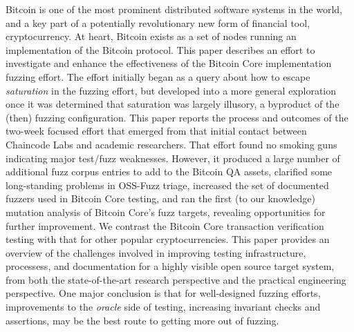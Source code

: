 Bitcoin is one of the most prominent distributed software systems in the world, and a key part of a potentially revolutionary new form of financial tool, cryptocurrency.  At heart, Bitcoin exists as a set of nodes running an implementation of the Bitcoin protocol.  This paper describes an effort to investigate and enhance the effectiveness of the Bitcoin Core implementation fuzzing effort.  The effort initially began as a query about how to escape \emph{saturation} in the fuzzing effort, but developed into a more general exploration once it was determined that saturation was largely illusory, a byproduct of the (then) fuzzing configuration.  This paper reports the process and outcomes of the two-week focused effort that emerged from that initial contact between Chaincode Labs and academic researchers.  That effort found no smoking guns indicating major test/fuzz weaknesses. However, it produced a large number of additional fuzz corpus entries to add to the Bitcoin QA assets, clarified some long-standing problems in OSS-Fuzz triage, increased the set of documented fuzzers used in Bitcoin Core testing, and ran the first (to our knowledge) mutation analysis of Bitcoin Core's fuzz targets, revealing opportunities for further improvement.  We contrast the Bitcoin Core transaction verification testing with that for other popular cryptocurrencies.  This paper provides an overview of the challenges involved in improving testing infrastructure, processess, and documentation for a highly visible open source target system, from both the state-of-the-art research perspective and the practical engineering perspective.  One major conclusion is that for well-designed fuzzing efforts, improvements to the \emph{oracle} side of testing, increasing invariant checks and assertions, may be the best route to getting more out of fuzzing.